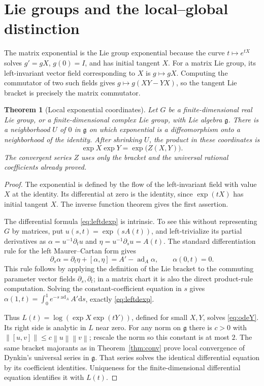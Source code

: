 \documentclass[11pt]{article}
\newtheorem{theorem}{Theorem}[section]
\theoremstyle{definition}
\theoremstyle{remark}
\newcommand{\g}{\mathfrak g}
\newcommand{\dd}{\mathrm d}
\newcommand{\ad}{\operatorname{ad}}
\newcommand{\norm}[1]{\left\lVert #1\right\rVert}
\numberwithin{equation}{section}
\begin{document}
\section{Lie groups and the local--global distinction}\label{sec:liegroups}
The matrix exponential is the Lie group exponential because the curve $t\mapsto e^{tX}$ solves $g'=gX$, $g(0)=I$, and has initial tangent $X$. For a matrix Lie group, its left-invariant vector field corresponding to $X$ is $g\mapsto gX$. Computing the commutator of two such fields gives $g\mapsto g(XY-YX)$, so the tangent Lie bracket is precisely the matrix commutator.

\begin{theorem}[Local exponential coordinates]\label{thm:local}
Let $G$ be a finite-dimensional real Lie group, or a finite-dimensional complex Lie group, with Lie algebra $\g$. There is a neighborhood $U$ of $0$ in $\g$ on which exponential is a diffeomorphism onto a neighborhood of the identity. After shrinking $U$, the product in these coordinates is
\begin{equation}\label{eq:localproduct}
 \exp X\exp Y=\exp\bigl(Z(X,Y)\bigr).
\end{equation}
The convergent series $Z$ uses only the bracket and the universal rational coefficients already proved.
\end{theorem}
\begin{proof}
The exponential is defined by the flow of the left-invariant field with value $X$ at the identity. Its differential at zero is the identity, since $\exp(tX)$ has initial tangent $X$. The inverse function theorem gives the first assertion.

The differential formula \eqref{eq:leftdexp} is intrinsic. To see this without representing $G$ by matrices, put $u(s,t)=\exp(sA(t))$, and left-trivialize its partial derivatives as $\alpha=u^{-1}\partial_tu$ and $\eta=u^{-1}\partial_su=A(t)$. The standard differentiation rule for the left Maurer--Cartan form gives
\[
 \partial_s\alpha=\partial_t\eta+[\alpha,\eta]
                  =A'-\ad_A\alpha,\qquad \alpha(0,t)=0.
\]
This rule follows by applying the definition of the Lie bracket to the commuting parameter vector fields $\partial_s,\partial_t$; in a matrix chart it is also the direct product-rule computation. Solving the constant-coefficient equation in $s$ gives
$\alpha(1,t)=\int_0^1e^{-s\ad_A}A'\dd s$, exactly \eqref{eq:leftdexp}.

Thus $L(t)=\log(\exp X\exp(tY))$, defined for small $X,Y$, solves \eqref{eq:odeY}. Its right side is analytic in $L$ near zero. For any norm on $\g$ there is $c>0$ with $\norm{[u,v]}\leq c\norm u\norm v$; rescale the norm so this constant is at most $2$. The same bracket majorants as in Theorem~\ref{thm:conv} prove local convergence of Dynkin's universal series in $\g$. That series solves the identical differential equation by its coefficient identities. Uniqueness for the finite-dimensional differential equation identifies it with $L(t)$.
\end{proof}
\end{document}
